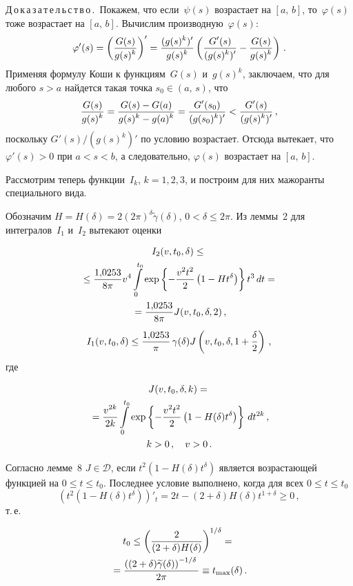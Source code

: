 \begin{multicols}{2}
\smallskip

\noindent
Д\,о\,к\,а\,з\,а\,т\,е\,л\,ь\,с\,т\,в\,о\,.\
Покажем, что если~$\psi(s)$ возрастает на $[a,\,b]$, то~$\varphi(s)$
тоже возрастает на $[a,\,b]$. Вычислим производную~$\varphi(s)$:
$$
\varphi'(s)=\left(\fr{G(s)}{g(s)^k}\right)'=
\fr{(g(s)^k)'}{g(s)^k}\left(\fr{G'(s)}{(g(s)^k)'}-
\fr{G(s)}{g(s)^k}\right)\,.
$$
Применяя формулу Коши к функциям~$G(s)$ и~$g(s)^k$, заключаем, что
для любого $s>a$ найдется такая точка $s_0\in(a,\,s)$, что
$$
\fr{G(s)}{g(s)^k}=
\fr{G(s)-G(a)}{g(s)^k-g(a)^k}=\fr{G'(s_0)}{(g(s_0)^k)'}<
\fr{G'(s)}{(g(s)^k)'}\,,
$$
поскольку ${G'(s)/(g(s)^k)'}$ по условию возрастает. Отсюда
вытекает, что $\varphi'(s)>0$ при $a<s<b$, а следовательно,
$\varphi(s)$ возрастает на $[a,\,b]$.

\smallskip

Рассмотрим теперь функции~$I_k$, $k=1, 2, 3$, и построим для них
мажоранты специального вида.

Обозначим
$
H=H(\delta)=2(2\pi)^\delta\widetilde{\gamma}(\delta)$, $0<\delta\le2\pi$.
Из леммы~2 для интегралов~$I_1$ и~$I_2$ вытекают оценки

\noindent
\begin{multline*}
I_2(v,t_0,\delta)\le{}\\
{}\le
 \fr{1{,}0253}{8\pi}v^4\int\limits_0^{t_0}
\exp\left\{-\fr{v^2t^2}2 \left(1-Ht^{\delta} \right)\right\} t^{3}\,dt={}\\
{}=
 \fr{1{,}0253}{8\pi} J(v,t_0,\delta,2)\,,
\end{multline*}
$$
I_1(v,t_0,\delta)\le \fr{1{,}0253}{\pi}\,\gamma(\delta)
J\left(v,t_0,\delta,1+\fr{\delta}{2}\right)\,,
$$
где

\noindent
\begin{multline*}
J(v,t_0,\delta,k)={}\\
{}= \fr{v^{2k}}{2k}\int\limits_0^{t_0}
\exp\left\{-\fr{v^2t^2}{2}\left(1-H(\delta)t^{\delta}\right) \right\}
\,dt^{2k}\,,\\
 k>0\,,\quad v>0\,.
\end{multline*}

Согласно лемме~8 $J\in\mathcal D$, если
$t^2\left(1-H(\delta)t^{\delta}\right)$ является возрастающей функцией на $0\le t\le
t_0$. Последнее условие выполнено, когда для всех $0\le t\le t_0$
$$
\left(t^2(1-H(\delta)t^{\delta})\right)'_t= 2t-(2+\delta)H(\delta)t^{1+\delta}\ge0\,,
$$
т.\,е.\

\noindent
\begin{multline*}
t_0\le \left(\fr{2}{(2+\delta)H(\delta)}\right)^{1/\delta}
={}\\
{}=
\fr{\left((2+\delta)\widetilde \gamma(\delta)
\right)^{-1/\delta}}{2\pi}\equiv t_{\max}(\delta)\,.
\end{multline*}


\end{multicols}
